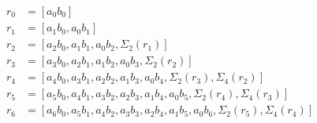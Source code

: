 \begin{equation*}
\begin{aligned}
r_0 &= [a_0 b_0] \\
r_1 &= [
a_1 b_0, 
a_0 b_1
] \\
r_2 &= [
a_2 b_0, 
a_1 b_1,
a_0 b_2,
\Sigma_2(r_1)
] \\
r_3 &= [
a_3 b_0,
a_2 b_1, 
a_1 b_2,
a_0 b_3,
\Sigma_2(r_2)
] \\
r_4 &= [
a_4 b_0,
a_3 b_1, 
a_2 b_2,
a_1 b_3,
a_0 b_4,
\Sigma_2(r_3),
\Sigma_4(r_2)
] \\
r_5 &= [
a_5 b_0,
a_4 b_1, 
a_3 b_2,
a_2 b_3,
a_1 b_4,
a_0 b_5,
\Sigma_2(r_4),
\Sigma_4(r_3)
] \\
r_6 &= [
a_6 b_0,
a_5 b_1, 
a_4 b_2,
a_3 b_3,
a_2 b_4,
a_1 b_5,
a_0 b_6,
\Sigma_2(r_5),
\Sigma_4(r_4)
] \\
\end{aligned}
\end{equation*}


